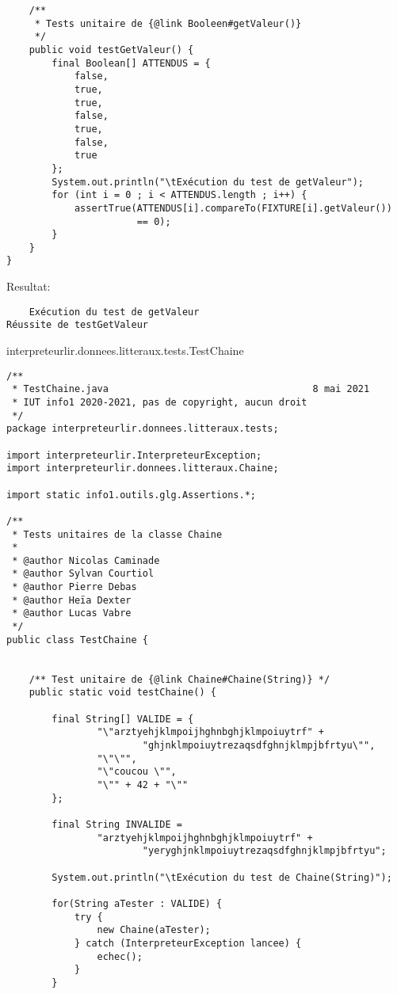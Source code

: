 \begin{enum}
\begin{verbatim}
    /** 
     * Tests unitaire de {@link Booleen#getValeur()}
     */
    public void testGetValeur() {
        final Boolean[] ATTENDUS = {
            false,
            true,
            true,
            false,
            true,
            false,
            true
        };
        System.out.println("\tExécution du test de getValeur");
        for (int i = 0 ; i < ATTENDUS.length ; i++) {
            assertTrue(ATTENDUS[i].compareTo(FIXTURE[i].getValeur())
                       == 0);
        }
    }
}
\end{verbatim}
Resultat:
\begin{verbatim}
    Exécution du test de getValeur
Réussite de testGetValeur
\end{verbatim}

    \item interpreteurlir.donnees.litteraux.tests.TestChaine
\begin{verbatim}
/**
 * TestChaine.java                                    8 mai 2021
 * IUT info1 2020-2021, pas de copyright, aucun droit
 */
package interpreteurlir.donnees.litteraux.tests;

import interpreteurlir.InterpreteurException;
import interpreteurlir.donnees.litteraux.Chaine;

import static info1.outils.glg.Assertions.*;

/**  
 * Tests unitaires de la classe Chaine
 * 
 * @author Nicolas Caminade
 * @author Sylvan Courtiol
 * @author Pierre Debas
 * @author Heïa Dexter
 * @author Lucas Vabre
 */
public class TestChaine {


    /** Test unitaire de {@link Chaine#Chaine(String)} */
    public static void testChaine() {

        final String[] VALIDE = { 
                "\"arztyehjklmpoijhghnbghjklmpoiuytrf" + 
                        "ghjnklmpoiuytrezaqsdfghnjklmpjbfrtyu\"", 
                "\"\"",
                "\"coucou \"",
                "\"" + 42 + "\""
        };  

        final String INVALIDE =
                "arztyehjklmpoijhghnbghjklmpoiuytrf" + 
                        "yeryghjnklmpoiuytrezaqsdfghnjklmpjbfrtyu";

        System.out.println("\tExécution du test de Chaine(String)");

        for(String aTester : VALIDE) {
            try {
                new Chaine(aTester);
            } catch (InterpreteurException lancee) {
                echec();
            }
        }


\end{verbatim}
\end{enum}
